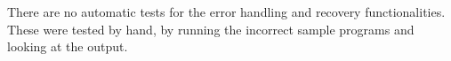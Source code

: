 \documentclass[a4paper]{article}
\begin{document}
There are no automatic tests for the error handling and recovery 
functionalities. These were tested by hand, by running the incorrect 
sample programs and looking at the output.
\clearpage
\appendix
  
\newcommand{\pdfappendix}[2]{%

}


\end{document}
